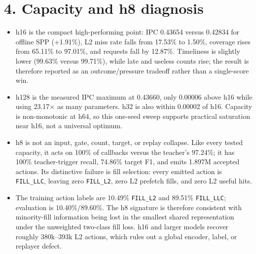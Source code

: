 \documentclass[10pt]{article}
\begin{document}
\section*{4. Capacity and h8 diagnosis}
\begin{infobox}[fontupper=\small]
\begin{itemize}[itemsep=1pt,topsep=1pt]
\item h16 is the compact high-performing point: IPC 0.43654 versus 0.42834 for offline SPP (+1.91\%), L2 miss rate falls from 17.53\% to 1.50\%, coverage rises from 65.11\% to 97.01\%, and requests fall by 12.87\%. Timeliness is slightly lower (99.63\% versus 99.71\%), while late and useless counts rise; the result is therefore reported as an outcome/pressure tradeoff rather than a single-score win.
\item h128 is the measured IPC maximum at 0.43660, only 0.00006 above h16 while using 23.17$\times$ as many parameters. h32 is also within 0.00002 of h16. Capacity is non-monotonic at h64, so this one-seed sweep supports practical saturation near h16, not a universal optimum.
\item h8 is not an input, gate, count, target, or replay collapse. Like every
tested capacity, it acts on 100\% of callbacks versus the teacher's 97.24\%;
it has 100\% teacher-trigger recall, 74.86\% target F1, and emits 1.897M
accepted actions. Its distinctive failure is fill selection: every emitted
action is \texttt{FILL\_LLC}, leaving zero \texttt{FILL\_L2}, zero L2
prefetch fills, and zero L2 useful hits.
\item The training action labels are 10.49\% \texttt{FILL\_L2} and 89.51\% \texttt{FILL\_LLC}; evaluation is 10.40\%/89.60\%. The h8 signature is therefore consistent with minority-fill information being lost in the smallest shared representation under the unweighted two-class fill loss. h16 and larger models recover roughly 380k--393k L2 actions, which rules out a global encoder, label, or replayer defect.
\end{itemize}
\end{infobox}

\begin{center}\scriptsize
{}
\end{center}
\end{document}
